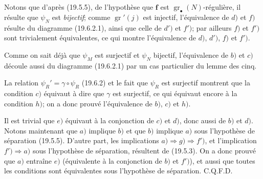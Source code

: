 Notons que d'après (19.5.5), de l'hypothèse que $\mathbf f$ est $\operatorname{gr}_\bullet(N)$-régulière, il résulte que $\psi_N$ est \emph{bijectif}; comme $\operatorname{gr}'(j)$ est injectif, l'équivalence de $d)$ et $f)$ résulte du diagramme (19.6.2.1), ainsi que celle de $d')$ et $f')$; par ailleurs $f)$ et $f')$ sont trivialement équivalentes, ce qui montre l'équivalence de $d)$, $d')$, $f)$ et $f')$.

Comme on sait déjà que $\psi_M$ est surjectif et $\psi_N$ bijectif, l'équivalence de $b)$ et $c)$ découle aussi du diagramme (19.6.2.1) par un cas particulier du lemme des cinq.

La relation $\psi_R'=\gamma\circ\psi_R$ (19.6.2) et le fait que $\psi_R$ est surjectif montrent que la condition $c)$ équivaut à dire que $\gamma$ est surjectif, ce qui équivaut encore à la condition $h)$; on a donc prouvé l'équivalence de $b)$, $c)$ et $h)$.

Il est trivial que $e)$ équivaut à la conjonction de $c)$ et $d)$, donc aussi de $b)$ et $d)$. Notons maintenant que $a)$ implique $b)$ et que $b)$ implique $a)$ sous l'hypothèse de séparation (19.5.5). D'autre part, les implications $a)\Rightarrow g)\Rightarrow f')$, et l'implication $f')\Rightarrow a)$ sous l'hypothèse de séparation, résultent de (19.5.3). On a donc prouvé que $a)$ entraîne $e)$ (équivalente à la conjonction de $b)$ et $f')$), et aussi que toutes les conditions sont équivalentes sous l'hypothèse de séparation. C.Q.F.D.

